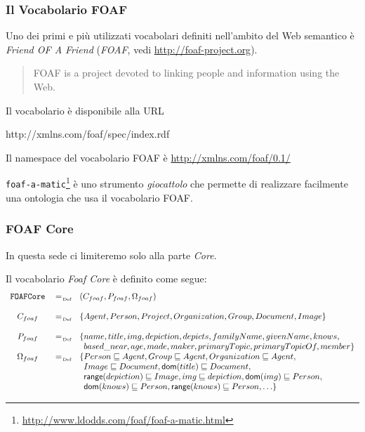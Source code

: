 \documentclass[8pt]{beamer}
\begin{document}
\begin{frame}
  \frametitle{Il Vocabolario FOAF}
  Uno dei primi e pi\`u utilizzati vocabolari definiti nell'ambito
  del Web semantico \`e \emph{Friend OF A Friend} (\emph{FOAF}, vedi \url{http://foaf-project.org}).
  \vspace{\baselineskip}

  \begin{quote}
  FOAF is a project devoted to linking people and information using the Web. 
  \end{quote}
  \vspace{\baselineskip}

  Il vocabolario \`e disponibile alla URL
  \begin{center}
    http://xmlns.com/foaf/spec/index.rdf  
  \end{center}
  \vspace{\baselineskip}

  Il namespace del vocabolario FOAF \`e \url{http://xmlns.com/foaf/0.1/}
  \vspace{\baselineskip}
  
  \texttt{foaf-a-matic}\footnote{\url{http://www.ldodds.com/foaf/foaf-a-matic.html}} \`e uno strumento \emph{giocattolo} che permette di realizzare facilmente
  una ontologia che usa il vocabolario FOAF.
\end{frame}

\newcommand{\foafcore}{\mathtt{FOAFCore}}
\begin{frame}
  \frametitle{FOAF Core}

  In questa sede ci limiteremo solo alla parte \emph{Core}.
  \vspace{\baselineskip}
  
  Il vocabolario \emph{Foaf Core} \`e definito come segue:
\[
 \begin{array}{ccl}
 \foafcore & \defAs & (C_{foaf}, P_{foaf}, \Omega_{foaf}) \\
 &&\\
 C_{foaf} & \defAs & \{Agent, Person, Project, Organization, Group, Document, Image\}\\
 &&\\
 P_{foaf} & \defAs & \{name, title, img, depiction, depicts, familyName, givenName, knows,\\
 && \phantom{\}} based\_near, age, made, maker, primaryTopic, primaryTopicOf, member \}\\
 \Omega_{foaf} & \defAs & \{ Person \Issub Agent, Group \Issub Agent, Organization \Issub Agent, \\
 && \phantom{\{} Image \Issub Document, \dom(title) \Issub Document, \\
 && \phantom{\{}\range(depiction) \Issub Image, img \Issub depiction, \dom(img) \Issub Person,\\
 && \phantom{\{}\dom(knows) \Issub Person, \range(knows) \Issub Person, \ldots \}\\
 \end{array}
\]
\end{frame}
\end{document}
